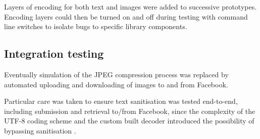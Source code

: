 Layers of encoding for both text and images were added to successive prototypes. Encoding layers could then be turned on and off during testing with command line switches to isolate bugs to specific library components.


\subsection{Integration testing}

Eventually simulation of the JPEG compression process was replaced by automated uploading and downloading of images to and from Facebook.

Particular care was taken to ensure text sanitisation was tested end-to-end, including submission and retrieval to/from Facebook, since the complexity of the UTF-8 coding scheme and the custom built decoder introduced the possibility of bypassing sanitisation \cite{utf8}.
